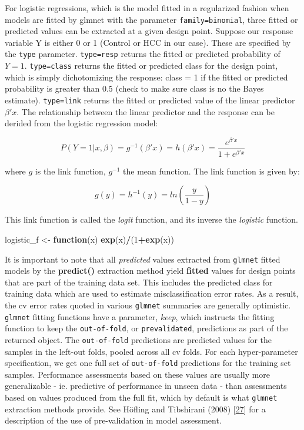 \documentclass[
]{book}
\newenvironment{Shaded}{\begin{snugshade}}{\end{snugshade}}
\newcommand{\ControlFlowTok}[1]{\textcolor[rgb]{0.13,0.29,0.53}{\textbf{#1}}}
\newcommand{\DecValTok}[1]{\textcolor[rgb]{0.00,0.00,0.81}{#1}}
\newcommand{\KeywordTok}[1]{\textcolor[rgb]{0.13,0.29,0.53}{\textbf{#1}}}
\newcommand{\NormalTok}[1]{#1}
\newcommand{\OperatorTok}[1]{\textcolor[rgb]{0.81,0.36,0.00}{\textbf{#1}}}
\newcommand{\StringTok}[1]{\textcolor[rgb]{0.31,0.60,0.02}{#1}}
\begin{document}
For logistic regressions, which is the model fitted in a regularized fashion
when models are fitted by glmnet with the parameter \texttt{family=\textquotesingle{}binomial\textquotesingle{}}, three
fitted or predicted values can be extracted at a given design point.
Suppose our response variable Y is either 0 or 1 (Control or HCC in our case).
These are specified by the \texttt{type} parameter. \texttt{type=\textquotesingle{}resp\textquotesingle{}} returns
the fitted or predicted probability of \(Y=1\). \texttt{type=\textquotesingle{}class\textquotesingle{}} returns the fitted or
predicted class for the design point, which is simply dichotomizing the
response: class = 1 if the fitted or predicted probability is greater than 0.5
(check to make sure class is no the Bayes estimate). \texttt{type=\textquotesingle{}link\textquotesingle{}} returns
the fitted or predicted value of the linear predictor \(\beta'x\). The relationship
between the linear predictor and the response can be derided from the
logistic regression model:

\[P(Y=1|x,\beta) = g^{-1}(\beta'x) = h(\beta'x) = \frac{e^{\beta'x}}{1+e^{\beta'x}}\]

where \(g\) is the link function, \(g^{-1}\) the mean function.
The link function is given by:

\[g(y) = h^{-1}(y) = ln(\frac{y}{1-y})\]

This link function is called the \emph{logit} function, and its inverse the \emph{logistic}
function.

\begin{Shaded}
\begin{Highlighting}[]
\NormalTok{logistic\_f <{-}}\StringTok{ }\ControlFlowTok{function}\NormalTok{(x) }\KeywordTok{exp}\NormalTok{(x)}\OperatorTok{/}\NormalTok{(}\DecValTok{1}\OperatorTok{+}\KeywordTok{exp}\NormalTok{(x))}
\end{Highlighting}
\end{Shaded}

It is important to note that all \emph{predicted} values extracted from
\texttt{glmnet} fitted models by the \textbf{predict()} extraction method
yield \textbf{fitted} values for design points that are part of the
training data set. This includes the predicted class for training data
which are used to estimate misclassification error rates. As a result, the cv error
rates quoted in various \texttt{glmnet} summaries are generally optimistic.
\texttt{glmnet} fitting functions have a
parameter, \emph{keep}, which instructs the fitting function to keep the
\texttt{out-of-fold}, or \texttt{prevalidated}, predictions as part of the returned object. The
\texttt{out-of-fold} predictions are predicted values for the samples in the
left-out folds, pooled across all cv folds. For each hyper-parameter
specification, we get one full set of \texttt{out-of-fold} predictions for
the training set samples. Performance assessments based on these
values are usually more generalizable - ie. predictive of
performance in unseen data - than assessments based on values
produced from the full fit, which by default is what \texttt{glmnet} extraction
methods provide. See Höfling and Tibshirani (2008) {[}\protect\hyperlink{ref-Hofling:2008aa}{27}{]}
for a description of the use of pre-validation in model assessment.
\end{document}
